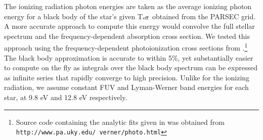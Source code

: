 \documentclass[twocolumn]{aastex61}
\begin{document}
The ionizing radiation photon energies are taken as the average ionizing photon energy for a black body of the star's given T$_{\rm eff}$ obtained from the PARSEC grid. A more accurate approach to compute this energy would convolve the full stellar spectrum and the frequency-dependent absorption cross section. We tested this approach using the frequency-dependent photoionization cross sections from \citet{1996ApJ...465..487V}.\footnote{Source code containing the analytic fits given in \citet{1996ApJ...465..487V} was obtained from \texttt{http://www.pa.uky.edu/~verner/photo.html}} The black body approximation is accurate to within 5\%, yet substantially easier to compute on the fly as integrals over the black body spectrum can be expressed as infinite series that rapidly converge to high precision. Unlike for the ionizing radiation, we assume constant FUV and Lyman-Werner band energies for each star, at 9.8 eV and 12.8 eV respectively.
\end{document}
